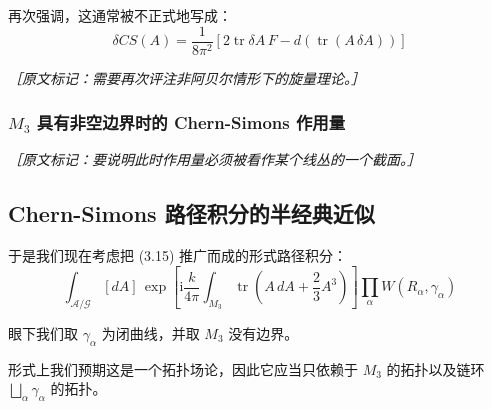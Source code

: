再次强调，这通常被不正式地写成：
\begin{equation}
  \delta CS(A)=\frac{1}{8\pi^{2}}\left[2\operatorname{tr}\delta A\,F-d\left(\operatorname{tr}(A\,\delta A)\right)\right]
  \tag{3.14}
  \label{eq:3.14}
\end{equation}

{\small\itshape ［原文标记：需要再次评注非阿贝尔情形下的旋量理论。］}

\subsubsection{\texorpdfstring{$M_3$}{M3} 具有非空边界时的 Chern-Simons 作用量} %

{\small\itshape ［原文标记：要说明此时作用量必须被看作某个线丛的一个截面。］}

\subsection{Chern-Simons 路径积分的半经典近似} %

于是我们现在考虑把 (3.15) 推广而成的形式路径积分：
\begin{equation}
  \int_{\mathcal{A}/\mathcal{G}}[dA]\,\exp\left[\mathrm{i}\frac{k}{4\pi}\int_{M_3}\operatorname{tr}\left(A\,dA+\frac{2}{3}A^{3}\right)\right]\prod_{\alpha}W(R_{\alpha},\gamma_{\alpha})
  \tag{3.15}
  \label{eq:3.15}
\end{equation}

眼下我们取 $\gamma_{\alpha}$ 为闭曲线，并取 $M_3$ 没有边界。

形式上我们预期这是一个拓扑场论，因此它应当只依赖于 $M_3$ 的拓扑以及链环 $\bigsqcup_{\alpha}\gamma_{\alpha}$ 的拓扑。

